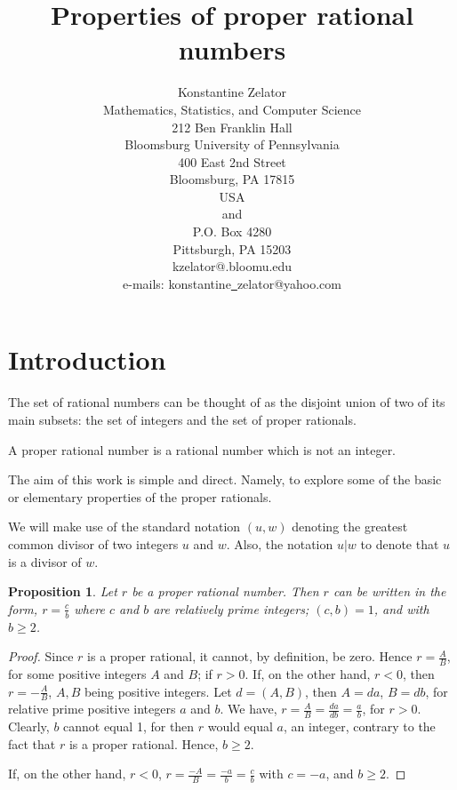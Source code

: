 \documentclass[12pt]{article}
\newtheorem{proposition}{Proposition}
\begin{document}
\title{{\bf Properties of proper rational numbers}}
\author{Konstantine Zelator\\
Mathematics, Statistics, and Computer Science\\
212 Ben Franklin Hall\\
Bloomsburg University of Pennsylvania\\
400 East 2nd Street\\
Bloomsburg, PA  17815\\
USA\\
and\\
P.O. Box 4280\\
Pittsburgh, PA  15203\\
kzelator@.bloomu.edu\\
e-mails: konstantine\underline{\ }zelator@yahoo.com}

\maketitle

\section{Introduction}

The set of rational numbers can be thought of as the disjoint union of two of
its main subsets:  the set of integers and the set of proper rationals.

\vspace{.15in}

  A proper rational number is a rational number
which is not an integer.

The aim of this work is simple and direct.  Namely, to explore some of the
basic or elementary properties of the proper rationals.

We will make use of the standard notation $(u,w)$ denoting the greatest common
divisor of two integers $u$ and $w$.  Also, the notation $u|w$ to denote that
$u$ is a divisor of $w$.

\begin{proposition}  Let $r$ be a proper rational number.  Then $r$ can be
  written in the form, $r=\frac{c}{b}$ where $c$ and $b$ are relatively prime
  integers; $(c,b)=1$, and with $b \geq 2$.
\end{proposition}

\begin{proof}  Since $r$ is a proper rational, it cannot, by definition, be
  zero.  Hence $r = \frac{A}{B}$, for some positive integers $A$ and $B$; if
  $r > 0$.  If, on the other hand, $r < 0$, then $r = -\frac{A}{B}$,  $A,B$
  being positive integers.  Let $d = (A,B)$, then $A =da$, $B = db$, for relative prime positive integers $a$ and $b$.  We have, $r = \frac{A}{B} =
  \frac{da}{db} = \frac{a}{b}$, for $ r > 0$.  Clearly, $b$ cannot equal 1,
  for then $r$ would equal $a$, an integer, contrary to the fact that $r$ is a
  proper rational.  Hence, $b \geq 2$.

If, on the other hand, $r < 0$, $r = \frac{-A}{B} = \frac{-a}{b} =
\frac{c}{b}$ with $c = -a$, and $b \geq 2$. \end{proof}
\end{document}
